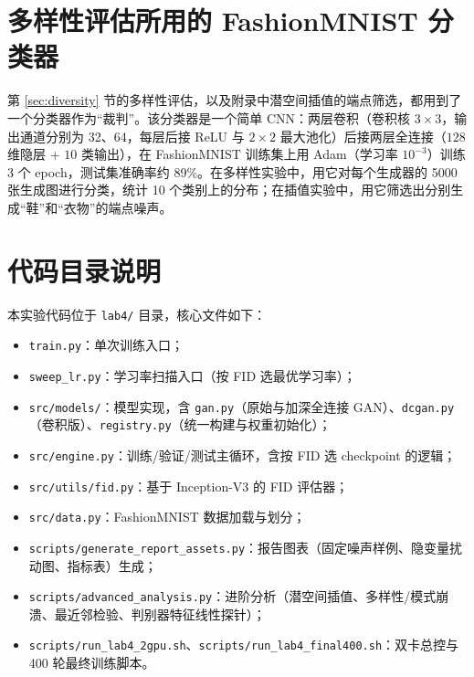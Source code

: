 \documentclass[a4paper]{article}
\begin{document}
\section{多样性评估所用的 FashionMNIST 分类器}
\label{app:clf}
第 \ref{sec:diversity} 节的多样性评估，以及附录中潜空间插值的端点筛选，都用到了一个分类器作为“裁判”。该分类器是一个简单 CNN：两层卷积（卷积核 $3\times3$，输出通道分别为 32、64，每层后接 ReLU 与 $2\times2$ 最大池化）后接两层全连接（$128$ 维隐层 + $10$ 类输出），在 FashionMNIST 训练集上用 Adam（学习率 $10^{-3}$）训练 3 个 epoch，测试集准确率约 89\%。在多样性实验中，用它对每个生成器的 5000 张生成图进行分类，统计 10 个类别上的分布；在插值实验中，用它筛选出分别生成“鞋”和“衣物”的端点噪声。

\section{代码目录说明}
本实验代码位于 \texttt{lab4/} 目录，核心文件如下：
\begin{itemize}
    \item \texttt{train.py}：单次训练入口；
    \item \texttt{sweep\_lr.py}：学习率扫描入口（按 FID 选最优学习率）；
    \item \texttt{src/models/}：模型实现，含 \texttt{gan.py}（原始与加深全连接 GAN）、\texttt{dcgan.py}（卷积版）、\texttt{registry.py}（统一构建与权重初始化）；
    \item \texttt{src/engine.py}：训练/验证/测试主循环，含按 FID 选 checkpoint 的逻辑；
    \item \texttt{src/utils/fid.py}：基于 Inception-V3 的 FID 评估器；
    \item \texttt{src/data.py}：FashionMNIST 数据加载与划分；
    \item \texttt{scripts/generate\_report\_assets.py}：报告图表（固定噪声样例、隐变量扰动图、指标表）生成；
    \item \texttt{scripts/advanced\_analysis.py}：进阶分析（潜空间插值、多样性/模式崩溃、最近邻检验、判别器特征线性探针）；
    \item \texttt{scripts/run\_lab4\_2gpu.sh}、\texttt{scripts/run\_lab4\_final400.sh}：双卡总控与 400 轮最终训练脚本。
\end{itemize}



\end{document}
